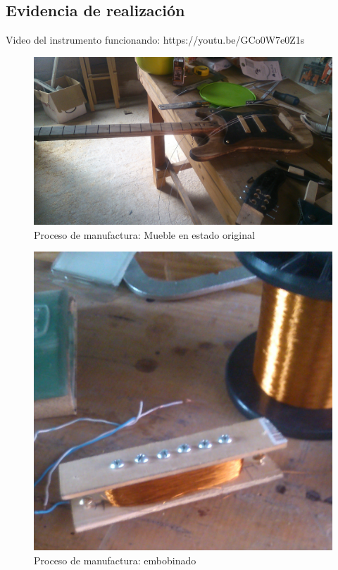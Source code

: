 
\subsection{Evidencia de realizaci\'on}
Video del instrumento funcionando: https://youtu.be/GCo0W7e0Z1s

\begin{figure}[!htbp]
\caption{Proceso de manufactura: Mueble en estado original}
\centering
\includegraphics [scale=0.1]{./img/DSC_0001.JPG}
\end{figure}

\begin{figure}[!htbp]
\caption{Proceso de manufactura: embobinado}
\centering
\includegraphics [scale=0.1]{./img/BOBINA.JPG}
\end{figure}


